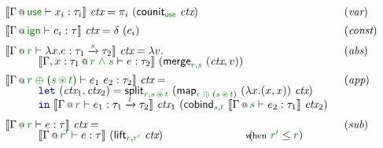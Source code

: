 \begin{figure*}[t]

\begin{equation*}
\begin{array}{ll}
\sem{\coctx{\Gamma}{\cunit} \vdash x_i : \tau_i }~\ctx =
  \pi_i~(\ident{counit}_{\cunit}~\ctx) & (\emph{var})
\\[0.5em]
\sem{\coctx{\Gamma}{\czero} \vdash c_i : \tau }~\ctx =
  \delta~(c_i) & (\emph{const})
\\[0.5em]
\sem{\coctx{\Gamma}{\cclrd{r}} \vdash \lambda x.e : \tau_1 \xrightarrow{\cclrd{s}} \tau_2 }~\ctx = \lambda v.& (\emph{abs})\\[-0.25em]
  \hspace{3em}\sem{\coctx{\Gamma, x:\tau_1}{\cclrd{r}\;\czip\;\cclrd{s}} \vdash e : \tau_2}~(\ident{merge}_{\cclrd{r}, \cclrd{s}}~(\ctx, v))
\\[0.5em]
\sem{\coctx{\Gamma}{\cclrd{r} \;\cpar\; (\cclrd{s} \,\cseq\, \cclrd{t})} \vdash e_1~e_2 : \tau_2}~\ctx = & (\emph{app})\\[-0.25em]
  \hspace{2.5em}
  \begin{array}{l}  
  \kvd{let}~(\ctx_1, \ctx_2) = \ident{split}_{\cclrd{r}, \cclrd{s} \,\cseq\, \cclrd{t}}~
    (\ident{map}_{\cclrd{r} \;\cpar\; (\cclrd{s} \,\cseq\, \cclrd{t})}~(\lambda x.(x,x))~\ctx) \\[-0.25em]
  \kvd{in}~\sem{\coctx{\Gamma}{\cclrd{r}} \vdash e_1 : \tau_1 \xrightarrow{\cclrd{t}} \tau_2}~\ctx_1~
      (\ident{cobind}_{\cclrd{s}, \cclrd{t}}~\sem{\coctx{\Gamma}{\cclrd{s}} \vdash e_2 : \tau_1 }~\ctx_2)
  \end{array}    
\\[1.25em]
\sem{\coctx{\Gamma}{\cclrd{r}} \vdash e : \tau }~\ctx = & (\emph{sub})\\[-0.25em]
  \hspace{3em}\sem{\coctx{\Gamma}{\cclrd{r'}} \vdash e : \tau }~(\ident{lift}_{\cclrd{r}, \cclrd{r'}}~\ctx)~
    \hspace{7.5em}(\hspace{-0.7em}\textnormal{\footnotesize when}~\cclrd{r'} \leq \cclrd{r})
\end{array}
\end{equation*}

\label{fig:flat-semantics}
\end{figure*}


